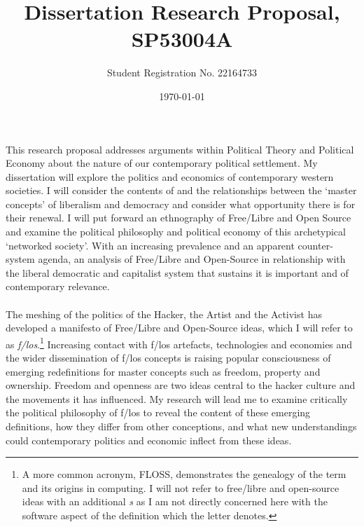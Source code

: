 \documentclass{article}
\title{Dissertation Research Proposal, SP53004A}
\author{Student Registration No. 22164733}
\date{\today}
\begin{document}
\begin{doublespace}

\maketitle
\paragraph{}This research proposal addresses arguments within Political Theory and Political Economy about the nature of our contemporary political settlement. My dissertation will explore the politics and economics of contemporary western societies. I will consider the contents of and the relationships between the `master concepts' of liberalism and democracy and consider what opportunity there is for their renewal. I will put forward an ethnography of Free/Libre and Open Source and examine the political philosophy and political economy of this archetypical `networked society'. With an increasing prevalence and an apparent counter-system agenda, an analysis of Free/Libre and Open-Source in relationship with the liberal democratic and capitalist system that sustains it is important and of contemporary relevance.

\paragraph{}The meshing of the politics of the Hacker, the Artist and the Activist has developed a manifesto of Free/Libre and Open-Source ideas, which I will refer to as \emph{f/los}.\footnote{A more common acronym, FLOSS, demonstrates the genealogy of the term and its origins in computing. I will not refer to free/libre and open-source ideas with an additional \emph{s} as I am not directly concerned here with the software aspect of the definition which the letter denotes.} Increasing contact with f/los artefacts, technologies and economies and the wider dissemination of f/los concepts is raising popular consciousness of emerging redefinitions for master concepts such as freedom, property and ownership. Freedom and openness are two ideas central to the hacker culture and the movements it has influenced. My research will lead me to examine critically the political philosophy of f/los to reveal the content of these emerging definitions, how they differ from other conceptions, and what new understandings could contemporary politics and economic inflect from these ideas.


\end{doublespace}
\end{document}
